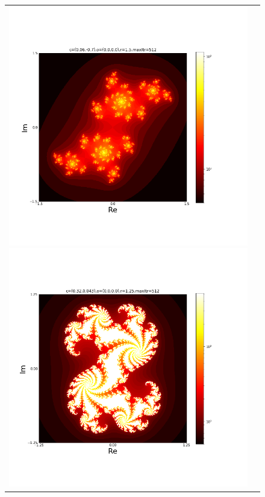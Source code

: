 \documentclass[uplatex,a4paper,11pt,oneside,openany]{jsbook}
\begin{document}
\begin{figure}[H]
  \centering
  \begin{tabular}{cc}
      \begin{minipage}{0.5\hsize}
      \centering
\includegraphics[bb=35 100 650 600,keepaspectratio,clip,scale=0.35]{../src/figure/julia001.png}
      \end{minipage}
      \begin{minipage}{0.5\hsize}
      \centering
\includegraphics[bb=35 100 650 600,keepaspectratio,clip,scale=0.35]{../src/figure/julia002.png}
      \end{minipage}
    \end{tabular}
\end{figure}%
\end{document}
